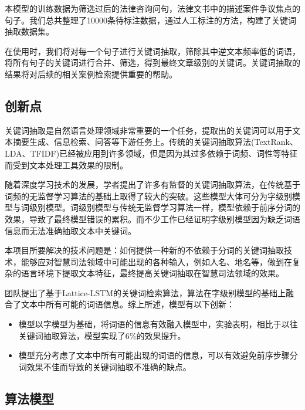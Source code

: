 本模型的训练数据为筛选过后的法律咨询问句，法律文书中的描述案件争议焦点的句子。我们总共整理了10000条待标注数据，通过人工标注的方法，构建了关键词抽取数据集。

在使用时，我们将对每一个句子进行关键词抽取，筛除其中逆文本频率低的词语，将所有句子的关键词进行合并、筛选，得到最终文章级别的关键词。关键词抽取的结果将对后续的相关案例检索提供重要的帮助。

\subsection{创新点}

关键词抽取是自然语言处理领域非常重要的一个任务，提取出的关键词可以用于文本摘要生成、信息检索、问答等下游任务上。传统的关键词抽取算法(TextRank、LDA、TFIDF)已经被应用到许多领域，但是因为其过多依赖于词频、词性等特征而受到文本处理工具效果的限制。

随着深度学习技术的发展，学者提出了许多有监督的关键词抽取算法，在传统基于词频的无监督学习算法的基础上取得了较大的突破。这些模型大体可分为字级别模型与词级别模型。词级别模型与传统无监督学习算法一样，模型依赖于前序分词的效果，导致了最终模型错误的累积。而不少工作已经证明字级别模型因为缺乏词语信息而无法准确抽取文本中关键词。

本项目所要解决的技术问题是：如何提供一种新的不依赖于分词的关键词抽取技术，能够应对智慧司法领域中可能出现的各种输入，例如人名、地名等，做到在复杂的语言环境下提取文本特征，最终提高关键词抽取在智慧司法领域的效果。

团队提出了基于Lattice-LSTM的关键词检索算法，算法在字级别模型的基础上融合了文本中所有可能的词语信息。综上所述，模型有以下创新：
\begin{itemize}
	\item 模型以字模型为基础，将词语的信息有效融入模型中，实验表明，相比于以往关键词抽取算法，模型实现了6\%的效果提升。
	\item 模型充分考虑了文本中所有可能出现的词语的信息，可以有效避免前序步骤分词效果不佳而导致的关键词抽取不准确的缺点。
\end{itemize}


\subsection{算法模型}

